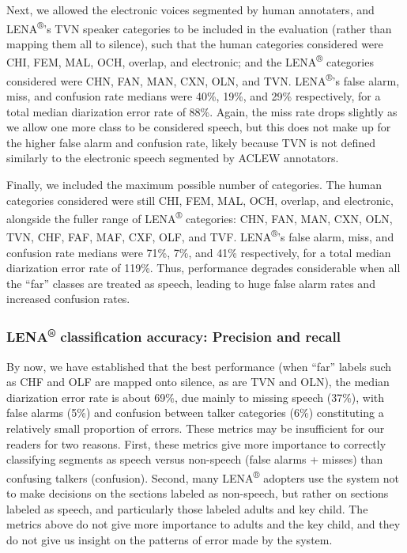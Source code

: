 \documentclass[english,table,man,floatsintext]{apa6}
\begin{document}
Next, we allowed the electronic voices segmented by human annotaters, and LENA\textsuperscript{®}'s TVN speaker categories to be included in the evaluation (rather than mapping them all to silence), such that the human categories considered were CHI, FEM, MAL, OCH, overlap, and electronic; and the LENA\textsuperscript{®} categories considered were CHN, FAN, MAN, CXN, OLN, and TVN. LENA\textsuperscript{®}'s false alarm, miss, and confusion rate medians were 40\%, 19\%, and 29\% respectively, for a total median diarization error rate of 88\%. Again, the miss rate drops slightly as we allow one more class to be considered speech, but this does not make up for the higher false alarm and confusion rate, likely because TVN is not defined similarly to the electronic speech segmented by ACLEW annotators.

Finally, we included the maximum possible number of categories. The human categories considered were still CHI, FEM, MAL, OCH, overlap, and electronic, alongside the fuller range of LENA\textsuperscript{®} categories: CHN, FAN, MAN, CXN, OLN, TVN, CHF, FAF, MAF, CXF, OLF, and TVF. LENA\textsuperscript{®}'s false alarm, miss, and confusion rate medians were 71\%, 7\%, and 41\% respectively, for a total median diarization error rate of 119\%. Thus, performance degrades considerable when all the \enquote{far} classes are treated as speech, leading to huge false alarm rates and increased confusion rates.

\hypertarget{lena-classification-accuracy-precision-and-recall}{%
\subsubsection{\texorpdfstring{LENA\textsuperscript{®} classification accuracy: Precision and recall}{LENA® classification accuracy: Precision and recall}}\label{lena-classification-accuracy-precision-and-recall}}

By now, we have established that the best performance (when \enquote{far} labels such as CHF and OLF are mapped onto silence, as are TVN and OLN), the median diarization error rate is about 69\%, due mainly to missing speech (37\%), with false alarms (5\%) and confusion between talker categories (6\%) constituting a relatively small proportion of errors. These metrics may be insufficient for our readers for two reasons. First, these metrics give more importance to correctly classifying segments as speech versus non-speech (false alarms + misses) than confusing talkers (confusion). Second, many LENA\textsuperscript{®} adopters use the system not to make decisions on the sections labeled as non-speech, but rather on sections labeled as speech, and particularly those labeled adults and key child. The metrics above do not give more importance to adults and the key child, and they do not give us insight on the patterns of error made by the system.
\end{document}
